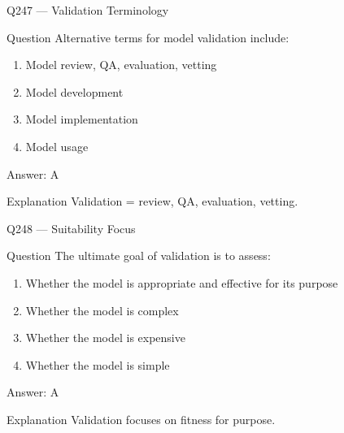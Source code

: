 \documentclass[aspectratio=169,8pt]{beamer}
\begin{document}
								\begin{frame}{Q247 --- Validation Terminology}
									\begin{block}{Question}
										Alternative terms for model validation include:
										\begin{enumerate}
											\item Model review, QA, evaluation, vetting
											\item Model development
											\item Model implementation
											\item Model usage
										\end{enumerate}
									\end{block}
									\begin{exampleblock}{Answer: A}\end{exampleblock}
									\begin{block}{Explanation}
										Validation = review, QA, evaluation, vetting.
									\end{block}
								\end{frame}
								
								\begin{frame}{Q248 --- Suitability Focus}
									\begin{block}{Question}
										The ultimate goal of validation is to assess:
										\begin{enumerate}
											\item Whether the model is appropriate and effective for its purpose
											\item Whether the model is complex
											\item Whether the model is expensive
											\item Whether the model is simple
										\end{enumerate}
									\end{block}
									\begin{exampleblock}{Answer: A}\end{exampleblock}
									\begin{block}{Explanation}
										Validation focuses on fitness for purpose.
									\end{block}
								\end{frame}
								
\end{document}
